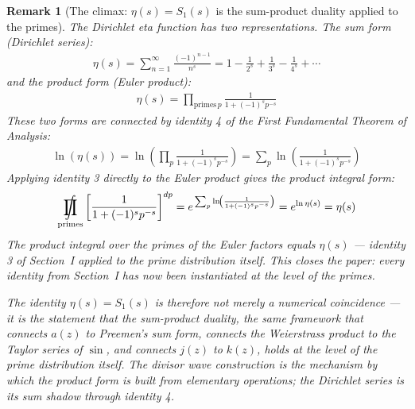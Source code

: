 \documentclass{article}
\newtheorem*{remark}{Remark}
\DeclareMathOperator*{\ProdInt}{%
\mathchoice%
  {\ooalign{$\displaystyle\prod$\cr\hidewidth$\displaystyle\int$\hidewidth\cr}}
  {\ooalign{\raisebox{.14\height}{\scalebox{.7}{$\textstyle\prod$}}\cr\hidewidth$\textstyle\int$\hidewidth\cr}}
  {\ooalign{\raisebox{.2\height}{\scalebox{.6}{$\scriptstyle\prod$}}\cr$\scriptstyle\int$\cr}}
  {\ooalign{\raisebox{.2\height}{\scalebox{.6}{$\scriptstyle\prod$}}\cr$\scriptstyle\int$\cr}}
}
\begin{document}
\begin{remark}[The climax: $\eta(s) = S_1(s)$ is the sum-product duality applied to the primes]
The Dirichlet eta function has two representations. The sum form (Dirichlet series):
\begin{align*}
\eta(s) = \sum_{n=1}^{\infty} \frac{(-1)^{n-1}}{n^s} = 1 - \frac{1}{2^s} + \frac{1}{3^s} - \frac{1}{4^s} + \cdots
\end{align*}
and the product form (Euler product):
\begin{align*}
\eta(s) = \prod_{\text{primes}\, p} \frac{1}{1+(-1)^s p^{-s}}
\end{align*}
These two forms are connected by identity 4 of the First Fundamental Theorem of Analysis:
\begin{align*}
\ln(\eta(s)) = \ln\!\left(\prod_{p} \frac{1}{1+(-1)^s p^{-s}}\right) = \sum_{p} \ln\!\left(\frac{1}{1+(-1)^s p^{-s}}\right)
\end{align*}
Applying identity 3 directly to the Euler product gives the product integral form:
\begin{align*}
\ProdInt_{\text{primes}} \left[\frac{1}{1+(-1)^s p^{-s}}\right]^{dp}
= e^{\,\sum_p \ln\!\left(\frac{1}{1+(-1)^s p^{-s}}\right)}
= e^{\ln\eta(s)} = \eta(s)
\end{align*}
The product integral over the primes of the Euler factors equals $\eta(s)$ — identity 3 of Section~I applied to the prime distribution itself. This closes the paper: every identity from Section~I has now been instantiated at the level of the primes.

The identity $\eta(s) = S_1(s)$ is therefore not merely a numerical coincidence — it is the statement that the sum-product duality, the same framework that connects $a(z)$ to Preemen's sum form, connects the Weierstrass product to the Taylor series of $\sin$, and connects $j(z)$ to $k(z)$, holds at the level of the prime distribution itself. The divisor wave construction is the mechanism by which the product form is built from elementary operations; the Dirichlet series is its sum shadow through identity 4.
\end{remark}
\end{document}
